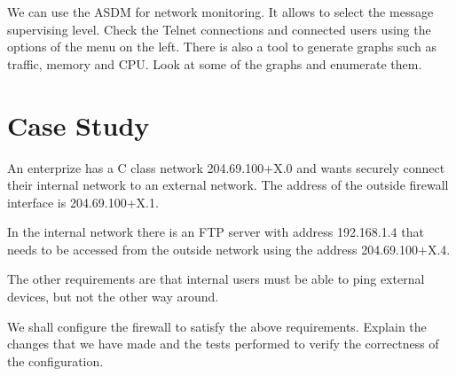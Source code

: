 We can use the ASDM for network monitoring. It allows to select the message supervising level. Check the Telnet connections and connected users using the options of the menu on the left. There is also a tool to generate graphs such as traffic, memory and CPU. Look at some of the graphs and enumerate them.

\section{Case Study}

An enterprize has a C class network 204.69.100+X.0 and wants securely connect their internal network to an external network. The address of the outside firewall interface is 204.69.100+X.1.

In the internal network there is an FTP server with address 192.168.1.4 that needs to be accessed from the outside network using the address 204.69.100+X.4.

The other requirements are that internal users must be able to ping external devices, but not the other way around.

We shall configure the firewall to satisfy the above requirements. Explain the changes that we have made and the tests performed to verify the correctness of the configuration.
